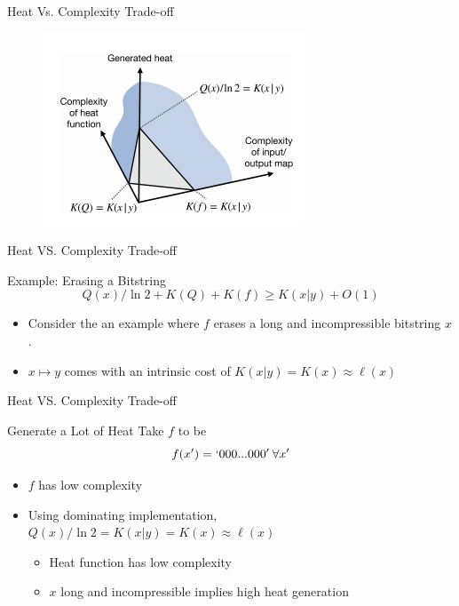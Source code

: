 \documentclass{beamer}
\begin{document}
\begin{frame}{Heat Vs. Complexity Trade-off}

    \begin{figure}
            \centering
            \includegraphics{HeatvsComplexity.png}
            \label{fig:my_label1}
        \end{figure}
    
\end{frame}


\begin{frame}{Heat VS. Complexity Trade-off}
    \begin{block}{Example: Erasing a Bitstring}
    \begin{equation*}
        Q(x)/\ln 2 + K(Q) + K(f) \ge K(x|y) + O(1)
    \end{equation*}
    \begin{itemize}
        \item Consider the an example where $f$ erases a long and incompressible bitstring $x$.
        \item $x\mapsto y$ comes with an intrinsic cost of $K(x|y) = K(x) \approx \ell(x)$
    \end{itemize}
    \end{block}
\end{frame}


\begin{frame}{Heat VS. Complexity Trade-off}
    \begin{block}{Generate a Lot of Heat}
    Take $f$ to be
    \begin{equation*}
        f(x') = `000...000' \:\forall x'
    \end{equation*}
    \begin{itemize}
        \item $f$ has low complexity
        \item Using dominating implementation, $Q(x)/\ln 2 = K(x|y) = K(x)\approx \ell(x)$
        \begin{itemize}
            \item Heat function has low complexity
            \item $x$ long and incompressible implies high heat generation
        \end{itemize}
    \end{itemize}
    \end{block}
\end{frame}
\end{document}
